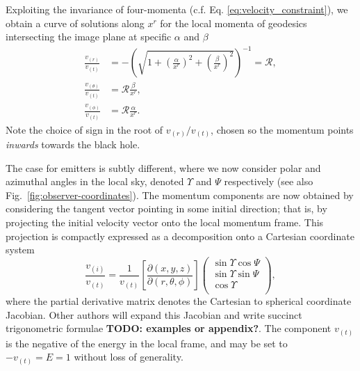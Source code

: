 \documentclass[fleqn,usenatbib]{mnras}
\newcommand{\todo}[1]{{\noindent \bf \color{red} TODO: #1}}
\newcommand{\pderiv}[2]{\frac{\partial #1}{\partial #2}}
\begin{document}
Exploiting the invariance of four-momenta (c.f. Eq.
\eqref{eq:velocity_constraint}), we obtain a curve of solutions along $x^r$ for
the local momenta of geodesics intersecting the image plane at specific
$\alpha$ and
$\beta$
\begin{align}
    \frac{v_{(r)}}{v_{(t)}} &= -\left( \sqrt{1 + \left(\frac{\alpha}{x^r}\right)^2 + \left(\frac{\beta}{x^r}\right)^2} \right)^{-1} = \mathscr{R}, \\
    \frac{v_{(\theta)}}{v_{(t)}} &= \mathscr{R} \frac{\beta}{x^r}, \\
    \frac{v_{(\phi)}}{v_{(t)}} &= \mathscr{R} \frac{\alpha}{x^r}.
\end{align}
Note the choice of sign in the root of $v_{(r)} / v_{(t)}$, chosen so the
momentum points \emph{inwards} towards the black hole.

The case for emitters is subtly different, where we now consider polar and
azimuthal angles in the local sky, denoted $\Upsilon$ and $\Psi$ respectively (see
also Fig.~\ref{fig:observer-coordinates}). The momentum components are now
obtained by considering the tangent vector pointing in some initial direction;
that is, by projecting the initial velocity vector onto the local momentum
frame. This projection is compactly expressed as a decomposition onto a
Cartesian coordinate system
\begin{equation}
    \label{eq:local-angle-to-velocity}
    \frac{v_{(i)}}{v_{(t)}} = \frac{1}{v_{(t)}}
    \left[\pderiv{(x, y, z)}{(r, \theta, \phi)}\right]
    \left(
    \begin{matrix}
        \sin \Upsilon \cos \Psi \\
        \sin \Upsilon \sin \Psi \\
        \cos \Upsilon \\
    \end{matrix}
    \right),
\end{equation}
where the partial derivative matrix denotes the Cartesian to spherical
coordinate Jacobian. Other authors will expand this Jacobian and write succinct
trigonometric formulae \todo{examples or appendix?}. The component $v_{(t)}$ is
the negative of the energy in the local frame, and may be set to $-v_{(t)}=E=1$
without loss of generality.
\end{document}
